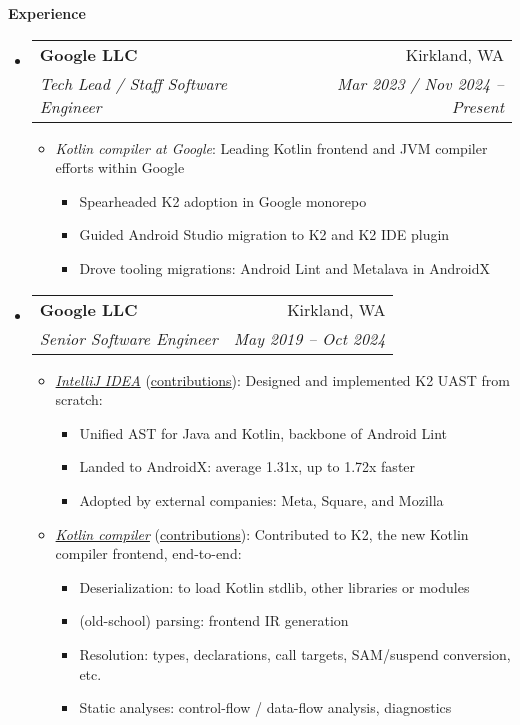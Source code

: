 \documentclass[letterpaper,11pt]{article}
\makeatletter
\newcommand{\resheading}[1]{{\large \colorbox{mygrey}{\begin{minipage}{\textwidth}{\textbf{#1 \vphantom{p\^{E}}}}\end{minipage}}}}
\newcommand{\ressubheading}[4]{
\begin{tabular*}{6.5in}{l@{\extracolsep{\fill}}r}
    \textbf{#1} & #2 \\
    \textit{#3} & \textit{#4} \\
\end{tabular*}\vspace{-6pt}}
\makeatother
\begin{document}
\resheading{Experience}
  \begin{itemize}
    \item
      \ressubheading{{Google LLC}}{Kirkland, WA}{Tech Lead / Staff Software Engineer}{Mar 2023 / Nov 2024 -- Present}
        {
\small
        \begin{itemize}
\item\emph{Kotlin compiler at Google}:
Leading Kotlin frontend and JVM compiler efforts within Google
\begin{itemize}
\item Spearheaded K2 adoption in Google monorepo
\item Guided Android Studio migration to K2 and K2 IDE plugin
\item Drove tooling migrations: Android Lint and Metalava in AndroidX
\end{itemize}
        \end{itemize}
        }
    \item
      \ressubheading{{Google LLC}}{Kirkland, WA}{Senior Software Engineer}{May 2019 -- Oct 2024}
        {
\small
        \begin{itemize}
\item\emph{\href{https://github.com/JetBrains/intellij-community}{IntelliJ IDEA}} (\href{https://github.com/JetBrains/intellij-community/commits?author=jsjeon}{\underline{contributions}}):
Designed and implemented K2 UAST from scratch:
\begin{itemize}
\item Unified AST for Java and Kotlin, backbone of Android Lint
\item Landed to AndroidX: average 1.31x, up to 1.72x faster
\item Adopted by external companies: Meta, Square, and Mozilla
\end{itemize}
\item\emph{\href{https://github.com/JetBrains/kotlin}{Kotlin compiler}} (\href{https://github.com/JetBrains/kotlin/commits?author=jsjeon}{\underline{contributions}}):
Contributed to K2, the new Kotlin compiler frontend, end-to-end:
\begin{itemize}
\item Deserialization: to load Kotlin stdlib, other libraries or modules
\item (old-school) parsing: frontend IR generation
\item Resolution: types, declarations, call targets, SAM/suspend conversion, etc.
\item Static analyses: control-flow / data-flow analysis, diagnostics

\end{itemize}
\end{itemize}}
\end{itemize}
\end{document}
